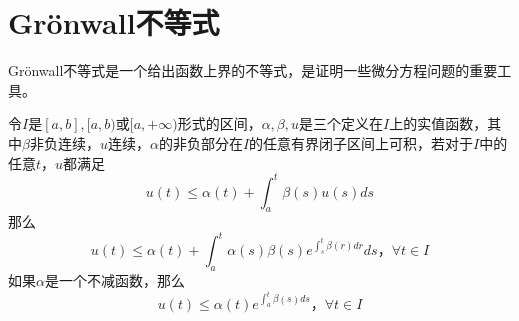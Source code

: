 \section{Grönwall不等式}

Grönwall不等式是一个给出函数上界的不等式，是证明一些微分方程问题的重要工具。
\begin{thm}
    令$I$是$[a,b],[a,b)$或$[a,+\infty)$形式的区间，$\alpha,\beta,u$是三个定义在$I$上的实值函数，其中$\beta$非负连续，$u$连续，$\alpha$的非负部分在$I$的任意有界闭子区间上可积，若对于$I$中的任意$t$，$u$都满足
    \begin{equation}\label{eq:gronwall}
        u(t) \leq \alpha(t) + \int_{a}^{t} \beta(s)u(s) ds
    \end{equation}
    那么
    \begin{equation}
        u(t) \leq \alpha(t) + \int_{a}^{t} \alpha(s)\beta(s) e^{\int_{s}^{t} \beta(r) dr} ds，\forall t \in I
    \end{equation}
    如果$\alpha$是一个不减函数，那么
    \begin{equation}\label{eq:gronwall2}
        u(t) \leq \alpha(t) e^{\int_{a}^{t} \beta(s) ds}，\forall t \in I
    \end{equation}
\end{thm}
